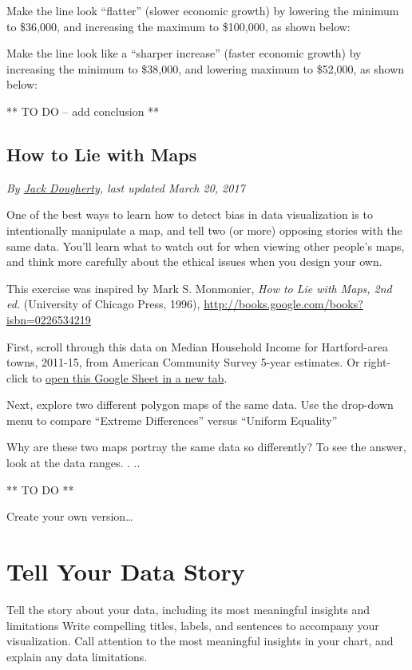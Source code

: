\documentclass[
  english,
]{book}
\begin{document}
Make the line look ``flatter'' (slower economic growth) by lowering the minimum to \$36,000, and increasing the maximum to \$100,000, as shown below:

Make the line look like a ``sharper increase'' (faster economic growth) by increasing the minimum to \$38,000, and lowering maximum to \$52,000, as shown below:

** TO DO -- add conclusion **

\hypertarget{how-to-lie-with-maps}{%
\section{How to Lie with Maps}\label{how-to-lie-with-maps}}

\emph{By \href{authors}{Jack Dougherty}, last updated March 20, 2017}

One of the best ways to learn how to detect bias in data visualization is to intentionally manipulate a map, and tell two (or more) opposing stories with the same data. You'll learn what to watch out for when viewing other people's maps, and think more carefully about the ethical issues when you design your own.

This exercise was inspired by Mark S. Monmonier, \emph{How to Lie with Maps, 2nd ed.} (University of Chicago Press, 1996), \url{http://books.google.com/books?isbn=0226534219}

First, scroll through this data on Median Household Income for Hartford-area towns, 2011-15, from American Community Survey 5-year estimates. Or right-click to \href{https://docs.google.com/spreadsheets/d/13bFHsXJtADIkUCGgjpO76RjrV0OAu62hzK-J3bXEVsk/edit\#gid=556312122}{open this Google Sheet in a new tab}.

Next, explore two different polygon maps of the same data. Use the drop-down menu to compare ``Extreme Differences'' versus ``Uniform Equality''

Why are these two maps portray the same data so differently? To see the answer, look at the data ranges. . ..

** TO DO **

Create your own version\ldots{}

\hypertarget{story}{%
\chapter{Tell Your Data Story}\label{story}}

Tell the story about your data, including its most meaningful insights and limitations
Write compelling titles, labels, and sentences to accompany your visualization. Call attention to the most meaningful insights in your chart, and explain any data limitations.
\end{document}
